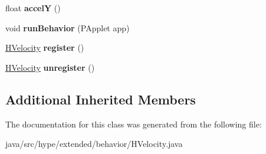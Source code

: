 \begin{DoxyCompactItemize}
\item 
\hypertarget{classhype_1_1extended_1_1behavior_1_1_h_velocity_a2c080c7d27b1aa158ba1500496d99841}{float {\bfseries accel\-Y} ()}\label{classhype_1_1extended_1_1behavior_1_1_h_velocity_a2c080c7d27b1aa158ba1500496d99841}

\item 
\hypertarget{classhype_1_1extended_1_1behavior_1_1_h_velocity_aa45608ad98aca9c56ca8c7b3037d6d01}{void {\bfseries run\-Behavior} (P\-Applet app)}\label{classhype_1_1extended_1_1behavior_1_1_h_velocity_aa45608ad98aca9c56ca8c7b3037d6d01}

\item 
\hypertarget{classhype_1_1extended_1_1behavior_1_1_h_velocity_a6a7fdab68c13b6149ca3cb89dc7da508}{\hyperlink{classhype_1_1extended_1_1behavior_1_1_h_velocity}{H\-Velocity} {\bfseries register} ()}\label{classhype_1_1extended_1_1behavior_1_1_h_velocity_a6a7fdab68c13b6149ca3cb89dc7da508}

\item 
\hypertarget{classhype_1_1extended_1_1behavior_1_1_h_velocity_a18ed38f274a98c3416a1626392b4aff5}{\hyperlink{classhype_1_1extended_1_1behavior_1_1_h_velocity}{H\-Velocity} {\bfseries unregister} ()}\label{classhype_1_1extended_1_1behavior_1_1_h_velocity_a18ed38f274a98c3416a1626392b4aff5}

\end{DoxyCompactItemize}
\subsection*{Additional Inherited Members}


The documentation for this class was generated from the following file\-:\begin{DoxyCompactItemize}
\item 
java/src/hype/extended/behavior/H\-Velocity.\-java\end{DoxyCompactItemize}
